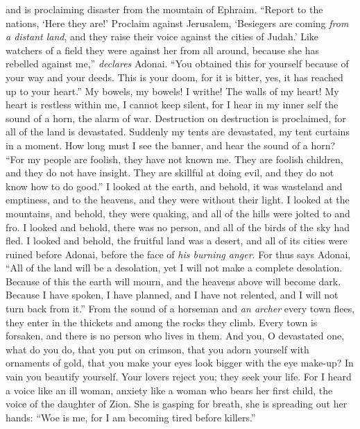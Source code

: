 \begin{biblechapter}
and is proclaiming disaster from the mountain of Ephraim.
\verse “Report to the nations, ‘Here they are!’ 
Proclaim against Jerusalem, 
‘Besiegers are coming \textit{from a distant land}, 
and they raise their voice against the cities of Judah.’
\verse Like watchers of a field they were against her from all around, 
because she has rebelled against me,” \textit{declares} Adonai.
\verse “You obtained this for yourself 
because of your way and your deeds. 
This is your doom, for it is bitter, 
yes, it has reached up to your heart.”
\verse My bowels, my bowels! I writhe! 
The walls of my heart! 
My heart is restless within me, I cannot keep silent, 
for I hear in my inner self the sound of a horn, the alarm of war.
\verse Destruction on destruction is proclaimed, 
for all of the land is devastated. 
Suddenly my tents are devastated, 
my tent curtains in a moment.
\verse How long must I see the banner, 
and hear the sound of a horn?
\verse “For my people are foolish, 
they have not known me. 
They are foolish children, 
and they do not have insight. 
They are skillful at doing evil, 
and they do not know how to do good.”
\verse I looked at the earth, and behold, it was wasteland and emptiness, 
and to the heavens, and they were without their light.
\verse I looked at the mountains, and behold, they were quaking, 
and all of the hills were jolted to and fro.
\verse I looked and behold, there was no person, 
and all of the birds of the sky had fled.
\verse I looked and behold, the fruitful land was a desert, 
and all of its cities were ruined before Adonai, 
before the face of \textit{his burning anger}.
\verse For thus says Adonai, “All of the land will be a desolation, 
yet I will not make a complete desolation.
\verse Because of this the earth will mourn, 
and the heavens above will become dark. 
Because I have spoken, I have planned, 
and I have not relented, and I will not turn back from it.”
\verse From the sound of a horseman and \textit{an archer} every town flees, 
they enter in the thickets and among the rocks they climb. 
Every town is forsaken, 
and there is no person who lives in them.
\verse And you, O devastated one, what do you do, 
that you put on crimson, 
that you adorn yourself with ornaments of gold, 
that you make your eyes look bigger with the eye make-up? 
In vain you beautify yourself. 
Your lovers reject you; 
they seek your life.
\verse For I heard a voice like an ill woman, 
anxiety like a woman who bears her first child, 
the voice of the daughter of Zion. 
She is gasping for breath, 
she is spreading out her hands: 
“Woe is me, for I am becoming tired before killers.”
\end{biblechapter}


